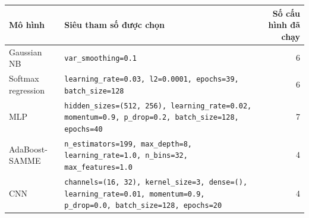 \begin{tabular}{@{}lp{9.0cm}r@{}}
\toprule
Mô hình & Siêu tham số được chọn & Số cấu hình đã chạy \\
\midrule
Gaussian NB & \texttt{var\_smoothing=0.1} & 6 \\
Softmax regression & \texttt{learning\_rate=0.03, l2=0.0001, epochs=39, batch\_size=128} & 6 \\
MLP & \texttt{hidden\_sizes=(512, 256), learning\_rate=0.02, momentum=0.9, p\_drop=0.2, batch\_size=128, epochs=40} & 7 \\
AdaBoost-SAMME & \texttt{n\_estimators=199, max\_depth=8, learning\_rate=1.0, n\_bins=32, max\_features=1.0} & 4 \\
CNN & \texttt{channels=(16, 32), kernel\_size=3, dense=(), learning\_rate=0.01, momentum=0.9, p\_drop=0.0, batch\_size=128, epochs=20} & 4 \\
\bottomrule
\end{tabular}
